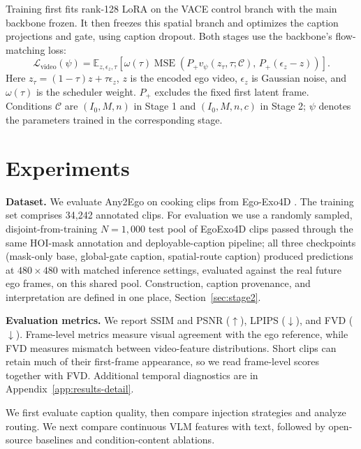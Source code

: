 \documentclass{article} %
\begin{document}
Training first fits rank-128 LoRA on the VACE control branch with the main
backbone frozen. It then freezes this spatial branch and optimizes the
caption projections and gate, using caption dropout. Both stages use the
backbone's flow-matching loss:
\begin{equation}
\mathcal L_{\mathrm{video}}(\psi)=
\mathbb E_{z,\epsilon_z,\tau}\!\left[
\omega(\tau)\operatorname{MSE}\!\left(
P_+v_\psi(z_\tau,\tau;\mathcal C),\,P_+(\epsilon_z-z)\right)\right].
\label{eq:video-training}
\end{equation}
Here $z_\tau=(1-\tau)z+\tau\epsilon_z$, $z$ is the encoded ego video,
$\epsilon_z$ is Gaussian noise, and $\omega(\tau)$ is the scheduler weight.
$P_+$ excludes the fixed first latent frame. Conditions $\mathcal C$ are
$(I_0,M,n)$ in Stage 1 and $(I_0,M,n,c)$ in Stage 2; $\psi$ denotes the
parameters trained in the corresponding stage.

\section{Experiments}
\label{sec:setup}
\label{sec:results}

\textbf{Dataset.} We evaluate Any2Ego on cooking clips from Ego-Exo4D
\citep{grauman2024egoexo4d}. The
training set comprises 34{,}242 annotated clips. For evaluation we use a
randomly sampled, disjoint-from-training $N=1{,}000$ test pool of EgoExo4D
clips passed through the same HOI-mask annotation and deployable-caption
pipeline; all three checkpoints (mask-only base, global-gate caption,
spatial-route caption) produced predictions at $480\times480$ with matched
inference settings, evaluated against the real future ego frames, on this
shared pool. Construction, caption provenance, and interpretation are defined
in one place, Section~\ref{sec:stage2}.

\textbf{Evaluation metrics.}
\label{sec:metrics}
We report SSIM and PSNR ($\uparrow$), LPIPS ($\downarrow$), and FVD
($\downarrow$). Frame-level metrics measure visual agreement with the ego
reference, while FVD measures mismatch between video-feature distributions.
Short clips can retain much of their first-frame appearance, so we read
frame-level scores together with FVD. Additional temporal diagnostics are
in Appendix~\ref{app:results-detail}.

We first evaluate caption quality, then compare injection strategies and
analyze routing. We next compare continuous VLM features with text,
followed by open-source baselines and condition-content ablations.
\end{document}
